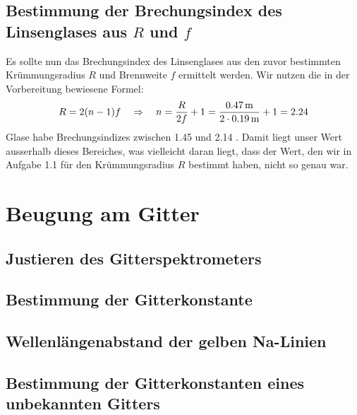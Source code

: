 \documentclass[a4paper,titlepage]{scrartcl}
\numberwithin{equation}{section}
\begin{document}
\subsection{Bestimmung der Brechungsindex des Linsenglases aus $R$ und $f$}
Es sollte nun das Brechungsindex des Linsenglases aus den zuvor bestimmten Krümmungsradius $R$ und Brennweite $f$ ermittelt werden. Wir nutzen die in der Vorbereitung bewiesene Formel:
\begin{equation*}
R=2(n-1)f \quad \Rightarrow \quad n=\frac{R}{2f}+1=\frac{\unit[0.47]{m}}{2 \cdot \unit[0.19]{m}}+1=2.24
\end{equation*}
Glase habe Brechungsindizes zwischen 1.45 und 2.14 \cite{wiki:brechungsindex}. Damit liegt unser Wert ausserhalb dieses Bereiches, was vielleicht daran liegt, dass der Wert, den wir in Aufgabe 1.1 für den Krümmungsradius $R$ bestimmt haben, nicht so genau war.
\section{Beugung am Gitter}
\subsection{Justieren des Gitterspektrometers}
\subsection{Bestimmung der Gitterkonstante}
\subsection{Wellenlängenabstand der gelben Na-Linien}
\subsection{Bestimmung der Gitterkonstanten eines unbekannten Gitters}

\newpage



\end{document}
